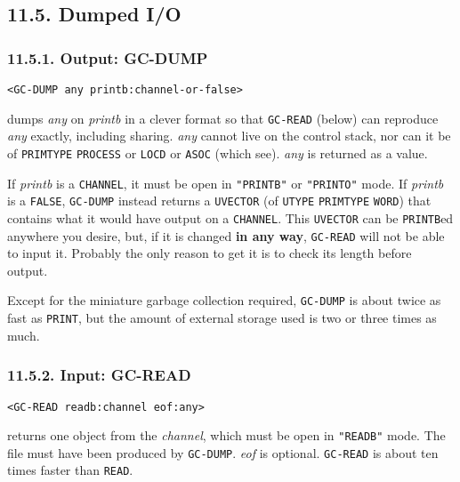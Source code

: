 \documentclass[a4paper,]{article}
\begin{document}
\subsection{11.5. Dumped I/O}\label{dumped-io}

\subsubsection{11.5.1. Output: GC-DUMP}\label{output-gc-dump}

\begin{verbatim}
<GC-DUMP any printb:channel-or-false>
\end{verbatim}

 dumps \emph{any} on \emph{printb} in a clever format so that \texttt{GC-READ} (below) can
reproduce \emph{any} exactly, including sharing. \emph{any} cannot live on the control stack, nor can it be of
\texttt{PRIMTYPE} \texttt{PROCESS} or \texttt{LOCD} or \texttt{ASOC} (which see). \emph{any} is returned as a value.

If \emph{printb} is a \texttt{CHANNEL}, it must be open in \texttt{"PRINTB"} or \texttt{"PRINTO"} mode. If \emph{printb} is
a \texttt{FALSE}, \texttt{GC-DUMP} instead returns a \texttt{UVECTOR} (of \texttt{UTYPE} \texttt{PRIMTYPE} \texttt{WORD})
that contains what it would have output on a \texttt{CHANNEL}. This \texttt{UVECTOR} can be \texttt{PRINTB}ed anywhere you
desire, but, if it is changed \textbf{in any way}, \texttt{GC-READ} will not be able to input it. Probably the only reason
to get it is to check its length before output.

Except for the miniature garbage collection required, \texttt{GC-DUMP} is about twice as fast as \texttt{PRINT}, but the
amount of external storage used is two or three times as much.

\subsubsection{11.5.2. Input: GC-READ}\label{input-gc-read}

\begin{verbatim}
<GC-READ readb:channel eof:any>
\end{verbatim}

 returns one object from the \emph{channel}, which must be open in \texttt{"READB"} mode.
The file must have been produced by \texttt{GC-DUMP}. \emph{eof} is optional. \texttt{GC-READ} is about ten times faster
than \texttt{READ}.
\end{document}

